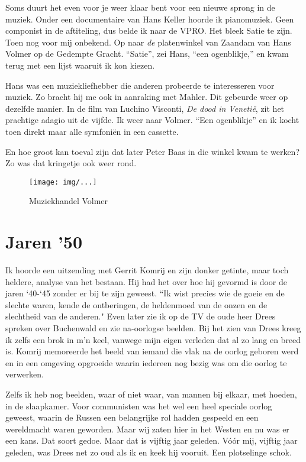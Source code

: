 \documentclass[10pt,twoside,openright]{memoir}
\begin{document}
Soms duurt het even voor je weer klaar bent voor een nieuwe sprong in de muziek. Onder een documentaire van Hans Keller hoorde ik pianomuziek. Geen componist in de aftiteling, dus belde ik naar de VPRO. Het bleek Satie te zijn. Toen nog voor mij onbekend. Op naar \emph{de} platenwinkel van Zaandam van Hans Volmer op de Gedempte Gracht. ``Satie'', zei Hans, ``een ogenblikje,'' en kwam terug met een lijst waaruit ik kon kiezen. 

Hans was een muziekliefhebber die anderen probeerde te interesseren voor muziek. Zo bracht hij me ook in aanraking met Mahler. Dit gebeurde weer op dezelfde manier. In de film van Luchino Visconti, \emph{De dood in Venetië}, zit het prachtige adagio uit de vijfde. Ik weer naar Volmer. ``Een ogenblikje'' en ik kocht toen direkt maar alle symfoniën in een cassette.

En hoe groot kan toeval zijn dat later Peter Baas in die winkel kwam te werken? Zo was dat kringetje ook weer rond. 

\begin{figure}[t]
\texttt{[image: img/...]}
\caption{Muziekhandel Volmer}
\end{figure}

\chapter{Jaren '50} %
\label{cha:jaren50}

Ik hoorde een uitzending met Gerrit Komrij en zijn donker getinte, maar toch heldere, analyse van het bestaan. Hij had het over hoe hij gevormd is door de jaren `40-`45 zonder er bij te zijn geweest. ``Ik wist precies wie de goeie en de slechte waren, kende de ontberingen, de heldenmoed van de onzen en de slechtheid van de anderen." Even later zie ik op de TV de oude heer Drees spreken over Buchenwald en zie na-oorlogse beelden. Bij het zien van Drees kreeg ik zelfs een brok in m’n keel, vanwege mijn eigen verleden dat al zo lang en breed is. Komrij memoreerde het beeld van iemand die vlak na de oorlog geboren werd en in een omgeving opgroeide waarin iedereen nog bezig was om die oorlog te verwerken. 

Zelfs ik heb nog beelden, waar of niet waar, van mannen bij elkaar, met hoeden, in de slaapkamer. Voor communisten was het wel een heel speciale oorlog geweest, waarin de Russen een belangrijke rol hadden gespeeld en een wereldmacht waren geworden. Maar wij zaten hier in het Westen en nu was er een kans. Dat soort gedoe. Maar dat is vijftig jaar geleden. Vóór mij, vijftig jaar geleden, was Drees net zo oud als ik en keek hij vooruit. Een plotselinge schok.
\end{document}
